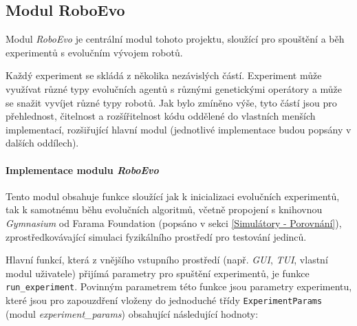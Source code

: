 \subsection{Modul RoboEvo} \label{imp:roboevo}
Modul \emph{RoboEvo} je centrální modul tohoto projektu, sloužící pro spouštění
a běh experimentů s evolučním vývojem robotů. 

Každý experiment se skládá z několika nezávislých částí. Experiment může
využívat různé typy evolučních agentů s různými genetickými operátory a může se
snažit vyvíjet různé typy robotů. Jak bylo zmíněno výše, tyto částí jsou pro
přehlednost, čitelnost a rozšířitelnost kódu oddělené do vlastních menších
implementací, rozšiřující hlavní modul (jednotlivé implementace budou popsány v
dalších oddílech). 

\paragraph{Implementace modulu \emph{RoboEvo}}
Tento modul obsahuje funkce sloužící jak k inicializaci evolučních experimentů,
tak k samotnému běhu evolučních algoritmů, včetně propojení s knihovnou
\emph{Gymnasium} od Farama Foundation (popsáno v sekci \ref{Simulátory -
Porovnání}), zprostředkovávající simulaci fyzikálního prostředí pro testování
jedinců.

Hlavní funkcí, která z vnějšího vstupního prostředí (např. \emph{GUI},
\emph{TUI}, vlastní modul uživatele) přijímá parametry pro spuštění
experimentů, je funkce \linebreak\texttt{run\_experiment}. Povinným parametrem
této funkce jsou parametry \linebreak experimentu, které jsou pro zapouzdření
vloženy do jednoduché třídy \linebreak\texttt{ExperimentParams} (modul
\emph{experiment\_params}) obsahující následující hodnoty:


